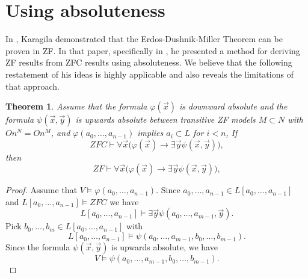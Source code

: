 \documentclass[a4paper,10pt,reqno]{amsart}
\numberwithin{equation}{section}
\newtheorem{theorem}{Theorem}[section]
\theoremstyle{definition}
\theoremstyle{remark}
\newcommand{\subs}{\subset}
\begin{document}
\section{Using absoluteness}\label{sc:inner}

In \cite[Example 1]{Ka14}, Karagila demonstrated that the Erdos-Dushnik-Miller Theorem can be proven in ZF. In that paper, specifically 
in \cite[Theorem 3 and 5]{Ka14}, he presented a method for deriving ZF results from ZFC results using absoluteness.
 We believe that the following restatement of his ideas is highly 
 applicable and also reveals the limitations of that approach.

\begin{theorem}\label{tm:inner}
Assume that the formula ${\varphi}(\vec x)$ is downward absolute and the formula 
$\psi(\vec x,\vec y)$ is  
upwards absolute
between transitive ZF models $M\subs N$ with $On^N=On^M$,
and ${\varphi}(a_0,\dots, a_{n-1})$ implies  $a_i\subs L$ for $i<n$, 
If 
\begin{displaymath}
ZFC \vdash \forall \vec x \big ( {\varphi}(\vec x) \to  \exists \vec y 
\psi(\vec x,\vec y) \big ),
\end{displaymath}
then 
\begin{displaymath}
    ZF \vdash \forall \vec x  \big ( {\varphi}(\vec  x) \to 
    \exists \vec y \psi(\vec  x,\vec y) \big ),
    \end{displaymath}
    \end{theorem}

\begin{proof}
Assume that $V\vDash{\varphi}(a_0,\dots, a_{n-1})$. 
Since  $a_0,\dots, a_{n-1}\in L[a_0,\dots, a_{n-1}]$
and $L[a_0,\dots, a_{n-1}]\vDash ZFC$ we have 
 \begin{displaymath}
    L[a_0,\dots, a_{n-1}] \vDash \exists \vec y \psi(a_0,\dots, a_{m-1},\vec y).
\end{displaymath}
 Pick $b_0,\dots, b_m\in L[a_0,\dots, a_{n-1}]$ with 
\begin{displaymath}
    L[a_0,\dots, a_{n-1}] \vDash \psi(a_0,\dots, a_{m-1}, b_0,\dots, b_{m-1}).
\end{displaymath}
Since the formula $\psi(\vec x,\vec y)$ is upwards absolute, we have  
$$V\vDash\psi(a_0,\dots, a_{m-1}, b_0,\dots, b_{m-1}).$$
\end{proof}
    
\end{document}
